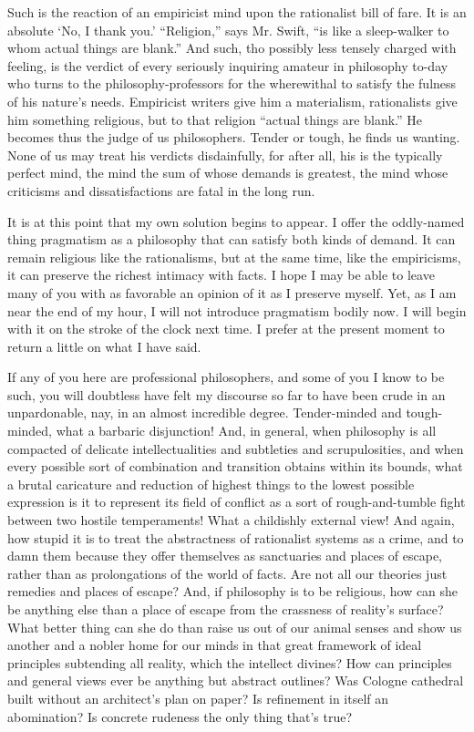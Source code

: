 \documentclass[]{article}
\begin{document}
Such is the reaction of an empiricist mind upon the rationalist bill of
fare. It is an absolute `No, I thank you.' ``Religion,'' says Mr. Swift,
``is like a sleep-walker to whom actual things are blank.'' And such,
tho possibly less tensely charged with feeling, is the verdict of
every seriously inquiring amateur in philosophy to-day who turns to the
philosophy-professors for the wherewithal to satisfy the fulness of his
nature's needs. Empiricist writers give him a materialism, rationalists
give him something religious, but to that religion ``actual things are
blank.'' He becomes thus the judge of us philosophers. Tender or tough,
he finds us wanting. None of us may treat his verdicts disdainfully, for
after all, his is the typically perfect mind, the mind the sum of whose
demands is greatest, the mind whose criticisms and dissatisfactions are
fatal in the long run.

It is at this point that my own solution begins to appear. I offer the
oddly-named thing pragmatism as a philosophy that can satisfy both kinds
of demand. It can remain religious like the rationalisms, but at the
same time, like the empiricisms, it can preserve the richest intimacy
with facts. I hope I may be able to leave many of you with as favorable
an opinion of it as I preserve myself. Yet, as I am near the end of my
hour, I will not introduce pragmatism bodily now. I will begin with it
on the stroke of the clock next time. I prefer at the present moment to
return a little on what I have said.

If any of you here are professional philosophers, and some of you I know
to be such, you will doubtless have felt my discourse so far to have
been crude in an unpardonable, nay, in an almost incredible degree.
Tender-minded and tough-minded, what a barbaric disjunction! And, in
general, when philosophy is all compacted of delicate intellectualities
and subtleties and scrupulosities, and when every possible sort of
combination and transition obtains within its bounds, what a brutal
caricature and reduction of highest things to the lowest possible
expression is it to represent its field of conflict as a sort of
rough-and-tumble fight between two hostile temperaments! What a
childishly external view! And again, how stupid it is to treat the
abstractness of rationalist systems as a crime, and to damn them because
they offer themselves as sanctuaries and places of escape, rather than
as prolongations of the world of facts. Are not all our theories just
remedies and places of escape? And, if philosophy is to be religious,
how can she be anything else than a place of escape from the crassness
of reality's surface? What better thing can she do than raise us out of
our animal senses and show us another and a nobler home for our minds in
that great framework of ideal principles subtending all reality, which
the intellect divines? How can principles and general views ever be
anything but abstract outlines? Was Cologne cathedral built without an
architect's plan on paper? Is refinement in itself an abomination? Is
concrete rudeness the only thing that's true?
\end{document}
